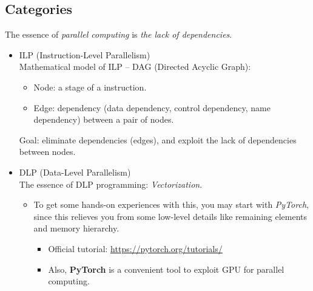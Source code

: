 \documentclass{article}
\begin{document}
\subsection{Categories}
The essence of \emph{parallel computing} is \emph{the lack of dependencies}.
\begin{itemize}
    \item ILP (Instruction-Level Parallelism)\\
    Mathematical model of ILP -- DAG (Directed Acyclic Graph):
    \begin{itemize}
        \item Node: a stage of a instruction.
        \item Edge: dependency (data dependency, control dependency, name dependency) between a pair of nodes.
    \end{itemize}
    Goal:
    eliminate dependencies (edges), and exploit the lack of dependencies between nodes.
    \item DLP (Data-Level Parallelism)\\
        The essence of DLP programming: \emph{Vectorization}.
        \begin{itemize}
            \item To get some hands-on experiences with this, you may start with \emph{PyTorch}, since this relieves you from some low-level details like remaining elements and memory hierarchy.
            \begin{itemize}
                \item Official tutorial: \href{https://pytorch.org/tutorials/}{https://pytorch.org/tutorials/}
                \item Also, \textbf{PyTorch} is a convenient tool to exploit GPU for parallel computing.
            \end{itemize}
        \end{itemize}
        

\end{itemize}
\end{document}
